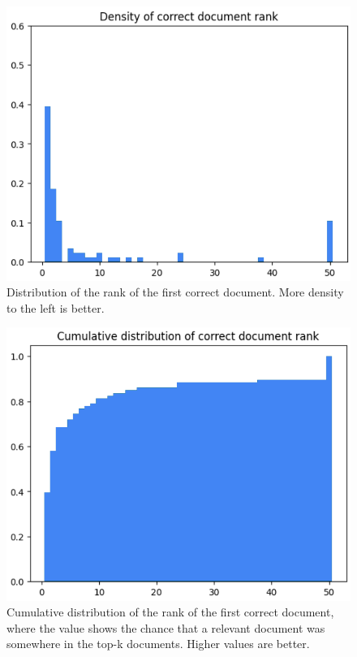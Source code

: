 \begin{figure}[H]
    \captionsetup{justification=centering}
    \centerline{\includegraphics[width=0.7\linewidth]{fig/rag_distribution.png}}
    \caption{Distribution of the rank of the first correct document. More density to the left is better.}
    \label{fig:chunk_rank_density}
\end{figure}

\begin{figure}[H]
    \captionsetup{justification=centering}
    \centerline{\includegraphics[width=0.7\linewidth]{fig/rag_cumulative_doc_rank.png}}
    \caption{Cumulative distribution of the rank of the first correct document, where the value shows the chance that a relevant document was somewhere in the top-k documents. Higher values are better.}
    \label{fig:chunk_rank_cumulative_distribution}
\end{figure}


